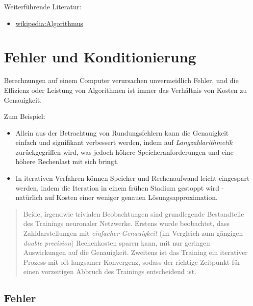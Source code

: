 \documentclass[
]{book}
\providecommand{\tightlist}{%
  \setlength{\itemsep}{0pt}\setlength{\parskip}{0pt}}
\newenvironment {JHSAYS} [0] {\begin{quote}\color{jhsc}} {\end{quote}}
\theoremstyle{definition}
\theoremstyle{definition}
\theoremstyle{definition}
\theoremstyle{definition}
\theoremstyle{remark}
\begin{document}
Weiterführende Literatur:

\begin{itemize}
\tightlist
\item
  \href{https://de.wikipedia.org/wiki/Algorithmus\#Definition}{wikipedia:Algorithmus}
\end{itemize}

\hypertarget{fehler-und-konditionierung}{%
\chapter{Fehler und Konditionierung}\label{fehler-und-konditionierung}}

\def\kij{(\kappa_{A,x})_{ij}}

Berechnungen auf einem Computer verursachen unvermeidlich Fehler, und die Effizienz oder Leistung von Algorithmen ist immer das Verhältnis von Kosten zu Genauigkeit.

Zum Beispiel:

\begin{itemize}
\item
  Allein aus der Betrachtung von Rundungsfehlern kann die Genauigkeit einfach und signifikant verbessert werden, indem auf \emph{Langzahlarithmetik} zurückgegriffen wird, was jedoch höhere Speicheranforderungen und eine höhere Rechenlast mit sich bringt.
\item
  In iterativen Verfahren können Speicher und Rechenaufwand leicht eingespart werden, indem die Iteration in einem frühen Stadium gestoppt wird - natürlich auf Kosten einer weniger genauen Lösungsapproximation.
\end{itemize}

\leavevmode\hypertarget{rem-accu-iter}{}%
\begin{JHSAYS}
Beide, irgendwie trivialen Beobachtungen sind grundlegende Bestandteile des Trainings neuronaler Netzwerke. Erstens wurde beobachtet, dass Zahldarstellungen mit \emph{einfacher Genauigkeit} (im Vergleich zum gängigen \emph{double precision}) Rechenkosten sparen kann, mit nur geringen Auswirkungen auf die Genauigkeit. Zweitens ist das Training ein iterativer Prozess mit oft langsamer Konvergenz, sodass der richtige Zeitpunkt für einen vorzeitigen Abbruch des Trainings entscheidend ist.

\end{JHSAYS}

\hypertarget{fehler}{%
\section{Fehler}\label{fehler}}
\end{document}
